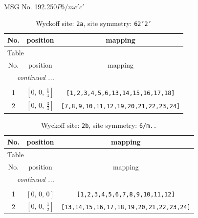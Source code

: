 \documentclass[fleqn,8pt]{jsarticle}
\begin{document}
\setcounter{MaxMatrixCols}{32}

\renewcommand{\tablename}{Table~}
\renewcommand{\figurename}{Figure~}
\begin{center}
\LARGE
MSG No. 192.250\quad$P6/mc'c'$
\end{center}
\renewcommand{\arraystretch}{1.2}
\begin{longtable}{ccc}
\caption{Wyckoff site: {\tt 2a}, site symmetry: {\tt 62'2'}}
 \\
 \hline \hline
No. & position & mapping \\ \hline \endfirsthead

\multicolumn{2}{l}{\tablename\ \thetable{}} \\
 \hline \hline
No. & position & mapping \\ \hline \endhead

 \hline \hline
\multicolumn{2}{r}{\footnotesize\it continued ...} \\ \endfoot

 \hline \hline
\multicolumn{2}{r}{} \\ \endlastfoot

1 & $\left[ 0,\, 0,\, \frac{1}{4} \right]$ & {\tt [1,2,3,4,5,6,13,14,15,16,17,18]} \\ \hline
2 & $\left[ 0,\, 0,\, \frac{3}{4} \right]$ & {\tt [7,8,9,10,11,12,19,20,21,22,23,24]} \\
\end{longtable}
\renewcommand{\arraystretch}{1.2}
\begin{longtable}{ccc}
\caption{Wyckoff site: {\tt 2b}, site symmetry: {\tt 6/m..}}
 \\
 \hline \hline
No. & position & mapping \\ \hline \endfirsthead

\multicolumn{2}{l}{\tablename\ \thetable{}} \\
 \hline \hline
No. & position & mapping \\ \hline \endhead

 \hline \hline
\multicolumn{2}{r}{\footnotesize\it continued ...} \\ \endfoot

 \hline \hline
\multicolumn{2}{r}{} \\ \endlastfoot

1 & $\left[ 0,\, 0,\, 0 \right]$ & {\tt [1,2,3,4,5,6,7,8,9,10,11,12]} \\ \hline
2 & $\left[ 0,\, 0,\, \frac{1}{2} \right]$ & {\tt [13,14,15,16,17,18,19,20,21,22,23,24]} \\
\end{longtable}
\end{document}
